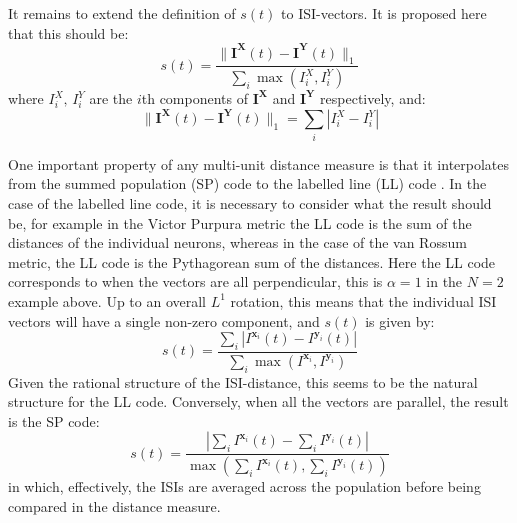 It remains to extend the definition of $s(t)$ to ISI-vectors. It is proposed here that this should be:
\begin{equation}
s(t) = \frac{ \| \mathbf{I^X}(t) - \mathbf{I^Y}(t) \|_1 }{ \sum_i \max ( I^X_i, I^Y_i ) }
\end{equation}
where $I^X_i, \, I^Y_i$ are the $i$th components of $\mathbf{I^X}$ and $\mathbf{I^Y}$ respectively, and:
\begin{equation}
\| \mathbf{I^X}(t) - \mathbf{I^Y}(t) \|_1 = \sum_i | I^X_i - I^Y_i |
\end{equation}

One important property of any multi-unit distance measure is that it interpolates from the summed population (SP) code  to the labelled line (LL) code .  In the case of the labelled line code, it is necessary to consider what the result should be, for example in the Victor Purpura metric the LL code is the sum of the distances of the individual neurons, whereas in the case of the van Rossum metric, the LL code is the Pythagorean sum of the distances.  Here the LL code corresponds to when the vectors are all perpendicular,   this is $\alpha=1$ in the $N=2$ example above.  Up to an overall $L^1$ rotation, this means that the individual ISI vectors will have a single non-zero component, and $s(t)$ is given by:
\begin{equation}
s(t) = \frac{\sum_i | I^{\mathbf{x}_i} (t)  - I^{\mathbf{y}_i}(t)|}{\sum_i \max (I^{\mathbf{x}_i},I^{\mathbf{y}_i})}
 \end{equation}
 Given the rational structure of the ISI-distance, this seems to be the natural structure for the LL code.  
Conversely, when all the vectors are parallel, the result is the SP code:
\begin{equation}
s(t) = \frac{| \sum_i I^{\mathbf{x}_i}(t) - \sum_i I^{\mathbf{y}_i}(t) |}{\max (\sum_i I^{\mathbf{x}_i}(t),\sum_i I^{\mathbf{y}_i}(t) )}
\end{equation}
in which, effectively, the ISIs are averaged across the population before being compared in the distance measure.
%
%


